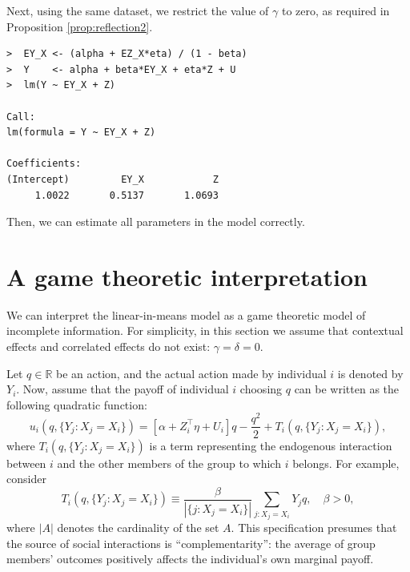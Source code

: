 \documentclass[10.5pt, A4paper, openany, uplatex]{book}
\numberwithin{equation}{section}
\begin{document}
Next, using the same dataset, we restrict the value of $\gamma$ to zero, as required in Proposition \ref{prop:reflection2}.
\begin{lstlisting}[basicstyle=\ttfamily\footnotesize, frame=single]
>  EY_X <- (alpha + EZ_X*eta) / (1 - beta)
>  Y    <- alpha + beta*EY_X + eta*Z + U
>  lm(Y ~ EY_X + Z)

Call:
lm(formula = Y ~ EY_X + Z)
	
Coefficients:
(Intercept)         EY_X            Z  
	 1.0022       0.5137       1.0693  
\end{lstlisting}
Then, we can estimate all parameters in the model correctly.

\section{A game theoretic interpretation}

We can interpret the linear-in-means model as a game theoretic model of incomplete information.
For simplicity, in this section we assume that contextual effects and correlated effects do not exist: $\gamma = \delta = 0$.

Let $q\in \mathbb{R}$ be an action, and the actual action made by individual $i$ is denoted by $Y_i$.
Now, assume that the payoff of individual $i$ choosing $q $ can be written as the following quadratic function:
\begin{equation*}
u_i(q, \{Y_j : X_j = X_i \})=\left[ \alpha + Z_i^\top \eta  + U_i \right] q -\frac{q^{2}}{2} + T_i(q, \{Y_j: X_j = X_i \}),
\end{equation*}
where $T_i(q, \{Y_j: X_j = X_i \})$ is a term representing the endogenous interaction between $i$ and the other members of the group to which $i$ belongs.  
For example, consider 
\begin{equation*}
T_i(q, \{Y_j : X_j = X_i \}) \equiv \dfrac{\beta}{|\{j : X_j = X_i \}|}\sum_{j : X_j = X_i}  Y_j q, \quad \beta > 0,
\end{equation*}
where $|A|$ denotes the cardinality of the set $A$.
This specification presumes that the source of social interactions is ``complementarity'': the average of group members' outcomes positively affects the individual's own marginal payoff.
\end{document}
